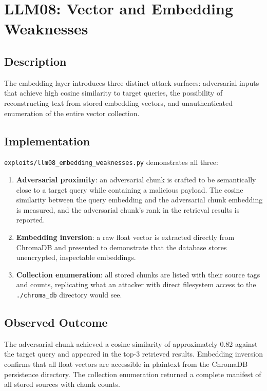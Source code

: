 \documentclass[12pt, a4paper]{report}
\begin{document}
\section{LLM08: Vector and Embedding Weaknesses}

\subsection{Description}

The embedding layer introduces three distinct attack surfaces: adversarial inputs that achieve
high cosine similarity to target queries, the possibility of reconstructing text from stored
embedding vectors, and unauthenticated enumeration of the entire vector collection.

\subsection{Implementation}

\texttt{exploits/llm08\_embedding\_weaknesses.py} demonstrates all three:

\begin{enumerate}
      \item \textbf{Adversarial proximity}: an adversarial chunk is crafted to be semantically
            close to a target query while containing a malicious payload. The cosine similarity
            between the query embedding and the adversarial chunk embedding is measured, and the
            adversarial chunk's rank in the retrieval results is reported.
      \item \textbf{Embedding inversion}: a raw float vector is extracted directly from ChromaDB
            and presented to demonstrate that the database stores unencrypted, inspectable
            embeddings.
      \item \textbf{Collection enumeration}: all stored chunks are listed with their source tags
            and counts, replicating what an attacker with direct filesystem access to the
            \texttt{./chroma\_db} directory would see.
\end{enumerate}

\subsection{Observed Outcome}

The adversarial chunk achieved a cosine similarity of approximately 0.82 against the target
query and appeared in the top-3 retrieved results. Embedding inversion confirms that all float
vectors are accessible in plaintext from the ChromaDB persistence directory. The collection
enumeration returned a complete manifest of all stored sources with chunk counts.
\end{document}
